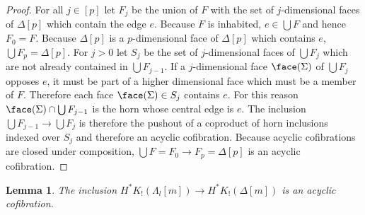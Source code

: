 \documentclass{amsart}
\theoremstyle{plain}
\newtheorem{lemma}[theorem]{Lemma}
\theoremstyle{definition}
\newcommand\ri{^*}
\begin{document}
\begin{proof} For all $j\in [p]$ let $F_j$ be the union of $F$ with the set of $j$-dimensional faces of $\Delta[p]$ which contain the edge $e$. Because $F$ is inhabited, $e\in \bigcup F$ and hence $F_0=F$. Because $\Delta[p]$ is a $p$-dimensional face of $\Delta[p]$ which contains $e$, $\bigcup F_p = \Delta[p]$. For $j>0$ let $S_j$ be the set of $j$-dimensional faces of $\bigcup F_j$ which are not already contained in $\bigcup F_{j-1}$. If a $j$-dimensional face $\face(\Sigma)$ of $\bigcup F_j$ opposes $e$, it must be part of a higher dimensional face which must be a member of $F$. Therefore each face $\face(\Sigma)\in S_j$ contains $e$. For this reason $\face(\Sigma)\cap \bigcup F_{j-1}$ is the horn whose central edge is $e$. The inclusion $\bigcup F_{j-1}\to\bigcup F_j$ is therefore the pushout of a coproduct of horn inclusions indexed over $S_j$ and therefore an acyclic cofibration. Because acyclic cofibrations are closed under composition, $\bigcup F = F_0\to F_p = \Delta[p]$ is an acyclic cofibration. 
\end{proof}


\begin{lemma} The inclusion $H\ri K_!(\Lambda_l[m]) \to H\ri K_!(\Delta[m])$ is an acyclic cofibration. \end{lemma}
\end{document}
